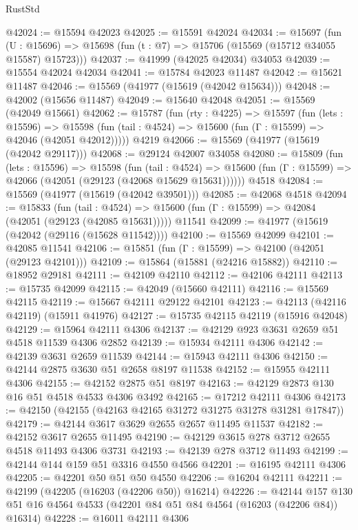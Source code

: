 \begin{lexlean}{RustStd}
\begin{coremodule}
@42024 := @15594 @42023
@42025 := @15591 @42024
@42034 := @15697
    (fun (U : @15696) => @15698 (fun (t : @7) => @15706 (@15569 (@15712 @34055 @15587) @15723)))
@42037 := @41999 (@42025 @42034) @34053
@42039 := @15554 @42024 @42034
@42041 := @15784 @42023 @11487
@42042 := @15621 @11487
@42046 := @15569 (@41977 (@15619 (@42042 @15634)))
@42048 := @42002 (@15656 @11487)
@42049 := @15640 @42048
@42051 := @15569 (@42049 @15661)
@42062 := @15787
    (fun (rty : @4225) =>
    @15597
      (fun (lets : @15596) =>
      @15598 (fun (tail : @4524) => @15600 (fun (Γ : @15599) => @42046 (@42051 @42012)))))
    @4219
@42066 := @15569 (@41977 (@15619 (@42042 @29117)))
@42068 := @29124 @42007 @34058
@42080 := @15809
    (fun (lets : @15596) =>
    @15598
      (fun (tail : @4524) =>
      @15600 (fun (Γ : @15599) => @42066 (@42051 (@29123 (@42068 @15629 @15631))))))
    @4518
@42084 := @15569 (@41977 (@15619 (@42042 @39501)))
@42085 := @42068 @4518
@42094 := @15833
    (fun (tail : @4524) => @15600 (fun (Γ : @15599) => @42084 (@42051 (@29123 (@42085 @15631)))))
    @11541
@42099 := @41977 (@15619 (@42042 (@29116 (@15628 @11542))))
@42100 := @15569 @42099
@42101 := @42085 @11541
@42106 := @15851 (fun (Γ : @15599) => @42100 (@42051 (@29123 @42101)))
@42109 := @15864 (@15881 (@24216 @15882))
@42110 := @18952 @29181
@42111 := @42109 @42110
@42112 := @42106 @42111
@42113 := @15735 @42099
@42115 := @42049 (@15660 @42111)
@42116 := @15569 @42115
@42119 := @15667 @42111 @29122 @42101
@42123 := @42113 (@42116 @42119) (@15911 @41976)
@42127 := @15735 @42115 @42119 (@15916 @42048)
@42129 := @15964 @42111 @4306
@42137 := @42129 @923 @3631 @2659 @51 @4518 @11539 @4306 @2852
@42139 := @15934 @42111 @4306
@42142 := @42139 @3631 @2659 @11539
@42144 := @15943 @42111 @4306
@42150 := @42144 @2875 @3630 @51 @2658 @8197 @11538
@42152 := @15955 @42111 @4306
@42155 := @42152 @2875 @51 @8197
@42163 := @42129 @2873 @130 @16 @51 @4518 @4533 @4306 @3492
@42165 := @17212 @42111 @4306
@42173 := @42150 (@42155 (@42163 @42165 @31272 @31275 @31278 @31281 @17847))
@42179 := @42144 @3617 @3629 @2655 @2657 @11495 @11537
@42182 := @42152 @3617 @2655 @11495
@42190 := @42129 @3615 @278 @3712 @2655 @4518 @11493 @4306 @3731
@42193 := @42139 @278 @3712 @11493
@42199 := @42144 @144 @159 @51 @3316 @4550 @4566
@42201 := @16195 @42111 @4306
@42205 := @42201 @50 @51 @50 @4550
@42206 := @16204 @42111
@42211 := @42199 (@42205 (@16203 (@42206 @50)) @16214)
@42226 := @42144
    @157
    @130
    @51
    @16
    @4564
    @4533
    (@42201 @84 @51 @84 @4564 (@16203 (@42206 @84)) @16314)
@42228 := @16011 @42111 @4306

\end{coremodule}
\end{lexlean}
